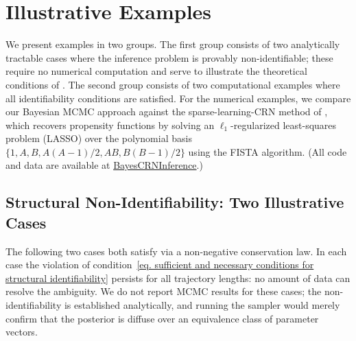 \section{Illustrative Examples}

We present examples in two groups. The first group consists of two analytically tractable cases where the inference problem is provably non-identifiable; these require no numerical computation and serve to illustrate the theoretical conditions of . The second group consists of two computational examples where all identifiability conditions are satisfied. For the numerical examples, we compare our Bayesian MCMC approach against the sparse-learning-CRN method of \cite{zhang2019learning}, which recovers propensity functions by solving an $\ell_1$-regularized least-squares problem (LASSO) over the polynomial basis $\{1,A,B,A(A{-}1)/2,AB,B(B{-}1)/2\}$ using the FISTA algorithm. (All code and data are available at \href{https://github.com/ssindiUCM/BayesCRNInference}{BayesCRNInference}.)

\subsection*{Structural Non-Identifiability: Two Illustrative Cases}

The following two cases both satisfy  via a non-negative conservation law. In each case the violation of condition~\eqref{eq. sufficient and necessary conditions for structural identifiability} persists for all trajectory lengths: no amount of data can resolve the ambiguity. We do not report MCMC results for these cases; the non-identifiability is established analytically, and running the sampler would merely confirm that the posterior is diffuse over an equivalence class of parameter vectors.

